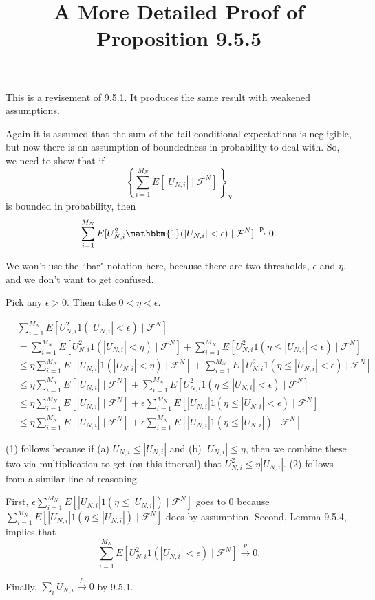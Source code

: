\documentclass{article}
\title{A More Detailed Proof of Proposition 9.5.5}
\begin{document}
\maketitle


This is a revisement of 9.5.1. It produces the same result with weakened assumptions. 

Again it is assumed that the sum of the tail conditional expectations is negligible, but now there is an assumption of boundedness in probability to deal with. So, we need to show that if 
$$
\left\{ \sum_{i=1}^{M_N} E[|U_{N,i}| \mid \mathcal{F}^N]  \right\}_N
$$
is bounded in probability, then 
$$
\sum_{i=1}^{M_N}E[U_{N,i}^2 \mathbbm{1}( |U_{N,i}| < \epsilon) \mid \mathcal{F}^N ] \overset{\text{p}}{\to} 0 .
$$

We won't use the ``bar" notation here, because there are two thresholds, $\epsilon$ and $\eta$, and we don't want to get confused. 

Pick any $\epsilon > 0$. Then take $0 < \eta < \epsilon$.

\begin{align*}
&\sum_{i=1}^{M_N} E\left[ U^2_{N,i}1( |U_{N,i}| < \epsilon ) \mid \mathcal{F}^N \right] \\
&= \sum_{i=1}^{M_N} E\left[ U^2_{N,i}1( |U_{N,i}| < \eta ) \mid \mathcal{F}^N \right] +  \sum_{i=1}^{M_N} E\left[ U^2_{N,i}1(\eta \le  |U_{N,i}| < \epsilon ) \mid \mathcal{F}^N \right] \\
&\le \eta \sum_{i=1}^{M_N} E\left[ |U_{N,i} |1( |U_{N,i}| < \eta ) \mid \mathcal{F}^N \right] +  \sum_{i=1}^{M_N} E\left[ U^2_{N,i}1(\eta \le  |U_{N,i}| < \epsilon ) \mid \mathcal{F}^N \right] \tag{1} \\
&\le \eta \sum_{i=1}^{M_N} E\left[ |U_{N,i} |\mid \mathcal{F}^N \right] +  \sum_{i=1}^{M_N} E\left[ U^2_{N,i}1(\eta \le  |U_{N,i}| < \epsilon ) \mid \mathcal{F}^N \right] \tag{more space} \\
&\le \eta \sum_{i=1}^{M_N} E\left[ |U_{N,i} |\mid \mathcal{F}^N \right] +  \epsilon \sum_{i=1}^{M_N} E\left[ |U_{N,i}|1(\eta \le  |U_{N,i}| < \epsilon ) \mid \mathcal{F}^N \right] \tag{2} \\
&\le \eta \sum_{i=1}^{M_N} E\left[ |U_{N,i} |\mid \mathcal{F}^N \right] +  \epsilon \sum_{i=1}^{M_N} E\left[ |U_{N,i}|1(\eta \le  |U_{N,i}| ) \mid \mathcal{F}^N \right] \tag{more space}
\end{align*}

(1) follows because if (a) $U_{N,i} \le |U_{N,i}|$ and (b) $|U_{N,i}| \le \eta$, then we combine these two via multiplication to get (on this itnerval) that $U_{N,i}^2 \le \eta |U_{N,i}|$. (2) follows from a similar line of reasoning.

First, $\epsilon \sum_{i=1}^{M_N} E\left[ |U_{N,i}|1(\eta \le  |U_{N,i}| ) \mid \mathcal{F}^N \right]$ goes to $0$ because $\sum_{i=1}^{M_N} E\left[ |U_{N,i}|1(\eta \le  |U_{N,i}| ) \mid \mathcal{F}^N \right]$ does by assumption. Second, Lemma 9.5.4, implies that
$$
\sum_{i=1}^{M_N} E\left[ U^2_{N,i}1( |U_{N,i}| < \epsilon ) \mid \mathcal{F}^N \right] \overset{p}{\to} 0.
$$

Finally, $\sum_i U_{N,i} \overset{p}{\to} 0$ by 9.5.1.
\end{document}
